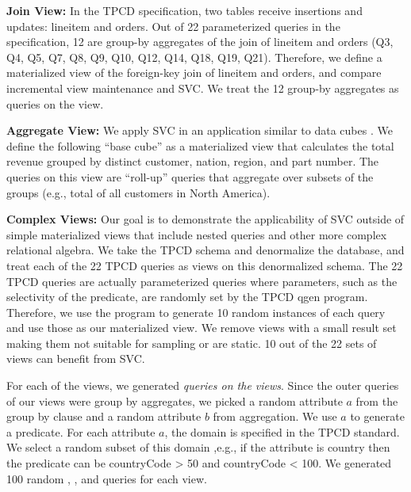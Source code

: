 \textbf{Join View: } In the TPCD specification, two tables receive insertions and updates: \textsf{lineitem} and \textsf{orders}.
Out of 22 parameterized queries in the specification, 12 are group-by aggregates of the join of \textsf{lineitem} and \textsf{orders} (Q3, Q4, Q5, Q7, Q8, Q9, Q10, Q12, Q14, Q18, Q19, Q21).
Therefore, we define a materialized view of the foreign-key join of \textsf{lineitem} and \textsf{orders}, and compare incremental view maintenance and SVC.
We treat the 12 group-by aggregates as queries on the view.

\textbf{Aggregate View: } We apply SVC in an application similar to data cubes \cite{gray1997data}.
We define the following ``base cube'' as a materialized view that calculates the total revenue 
grouped by distinct customer, nation, region, and part number.
The queries on this view are ``roll-up'' queries that aggregate over 
subsets of the groups (e.g., total of all customers in North America).

\textbf{Complex Views:} Our goal is to demonstrate the applicability of SVC outside of simple materialized views that include nested queries and other more complex relational algebra.
We take the TPCD schema and denormalize the database, and treat each of the 22 
TPCD queries as views on this denormalized schema. 
The 22 TPCD queries are actually parameterized queries where parameters, such as the selectivity of the predicate, are randomly set by the TPCD \textsf{qgen} program.
Therefore, we use the program to generate 10 random instances of each query and use those as our materialized view.
We remove views with a small result set making them not suitable for sampling or are static.
10 out of the 22 sets of views can benefit from SVC.


For each of the views, we generated \emph{queries on the views}.
Since the outer queries of our views were group by aggregates, we picked a random attribute $a$ from the group by clause and a random attribute $b$ from aggregation.
We use $a$ to generate a predicate.
For each attribute $a$, the domain is specified in the TPCD standard.
We select a random subset of this domain ,e.g., if the attribute is country then the predicate can be \textsf{countryCode} > 50 and \textsf{countryCode} < 100.
We generated 100 random \sumfunc, \avgfunc, and \countfunc queries for each view.

